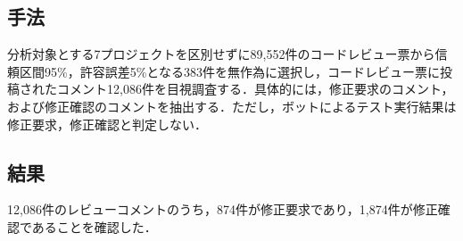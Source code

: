 \documentclass[T,J]{fose} %
\begin{document}
\subsection{手法}
分析対象とする7プロジェクトを区別せずに89,552件のコードレビュー票から信頼区間95\%，許容誤差5\%となる383件を無作為に選択し，コードレビュー票に投稿されたコメント12,086件を目視調査する．具体的には，修正要求のコメント，および修正確認のコメントを抽出する．ただし，ボットによるテスト実行結果は修正要求，修正確認と判定しない．


\subsection{結果}
12,086件のレビューコメントのうち，874件が修正要求であり，1,874件が修正確認であることを確認した．
\end{document}
